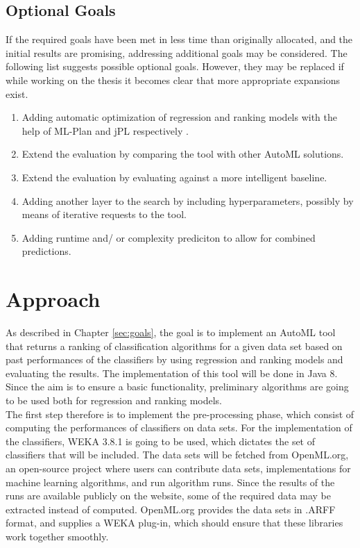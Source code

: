 \documentclass[12pt]{scrartcl}
\begin{document}
\subsection{Optional Goals}\label{subsec:optional_goals}
If the required goals have been met in less time than originally allocated, and the initial results are promising, addressing additional goals may be considered. The following list suggests possible optional goals. However, they may be replaced if while working on the thesis it becomes clear that more appropriate expansions exist.

\begin{enumerate}
	\item Adding automatic optimization of regression and ranking models with the help of ML-Plan and jPL\footnotemark{ } respectively \cite{intelligent2017jpl}.
	\item Extend the evaluation by comparing the tool with other AutoML solutions.
	\item Extend the evaluation by evaluating against a more intelligent baseline.
	\item Adding another layer to the search by including hyperparameters, possibly by means of iterative requests to the tool.
	\item Adding runtime and/ or complexity prediciton to allow for combined predictions.
\end{enumerate}

\section{Approach}\label{sec:approach}
As described in Chapter \ref{sec:goals}, the goal is to implement an AutoML tool that returns a ranking of classification algorithms for a given data set based on past performances of the classifiers by using regression and ranking models and evaluating the results. The implementation of this tool will be done in Java 8. Since the aim is to ensure a basic functionality, preliminary algorithms are going to be used both for regression and ranking models.\\ 

The first step therefore is to implement the pre-processing phase, which consist of computing the performances of classifiers on data sets. For the implementation of the classifiers, WEKA 3.8.1 is going to be used, which dictates the set of classifiers that will be included\footnotemark. The data sets will be fetched from OpenML.org, an open-source project where users can contribute data sets, implementations for machine learning algorithms, and run algorithm runs. Since the results of the runs are available publicly on the website, some of the required data may be extracted instead of computed. OpenML.org provides the data sets in .ARFF format, and supplies a WEKA plug-in, which should ensure that these libraries work together smoothly. \\
\end{document}
